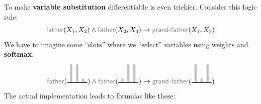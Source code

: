 \documentclass[runningheads]{llncs}
\newcommand\logic[1]{{\color{gray}\mathsf{#1}}}
\begin{document}
To make \textbf{variable substitution} differentiable is even trickier.  Consider this logic rule:
\begin{equation}
\logic{father}(X_1,X_2) \wedge \logic{father}(X_2,X_3) \rightarrow \logic{grand\hbox{-}father}(X_1,X_3)
\end{equation}
We have to imagine some ``slots'' where we ``select'' variables using weights and \textbf{softmax}:
\vspace{-0.2cm} \begin{equation}
\logic{father}(\begin{tikzpicture} \draw[line width=3pt, gray!50] (0.2,0.9) -- (0.2,0) (0.5,0.9) -- (0.5,0) (0.8,0.2) -- (0.8,0); \draw[thick] (0,0) to (1,0); \end{tikzpicture})
\wedge
\logic{father}(\begin{tikzpicture} \draw[line width=3pt, gray!50] (0.2,0.2) -- (0.2,0) (0.5,0.9) -- (0.5,0) (0.8,0.9) -- (0.8,0); \draw[thick] (0,0) to (1,0); \end{tikzpicture})
\rightarrow
\logic{grand\hbox{-}father}(\begin{tikzpicture} \draw[line width=3pt, gray!50] (0.2,0.9) -- (0.2,0) (0.5,0.2) -- (0.5,0) (0.8,0.9) -- (0.8,0); \draw[thick] (0,0) to (1,0); \end{tikzpicture})
\end{equation}
The actual implementation leads to formulas like these:
\end{document}
